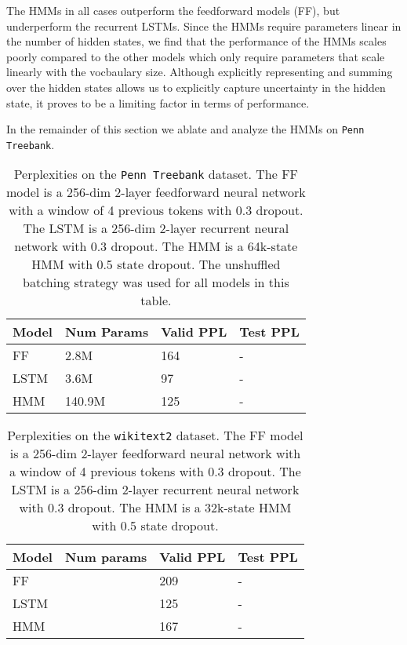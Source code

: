 \documentclass[11pt,a4paper]{article}
\begin{document}
The HMMs in all cases outperform the feedforward models (FF),
but underperform the recurrent LSTMs.
Since the HMMs require parameters linear in the number of hidden states,
we find that the performance of the HMMs scales poorly compared to the other models
which only require parameters that scale linearly with the vocbaulary size.
Although explicitly representing and summing over the hidden states
allows us to explicitly capture uncertainty in the hidden state,
it proves to be a limiting factor in terms of performance.

In the remainder of this section we ablate and analyze the HMMs on \texttt{Penn Treebank}.


\begin{table}[!t]
\centering
\caption{\label{tbl:ppl-ptb}
Perplexities on the \texttt{Penn Treebank} dataset.
The FF model is a 256-dim 2-layer feedforward neural network
with a window of 4 previous tokens with 0.3 dropout.
The LSTM is a 256-dim 2-layer recurrent neural network with 0.3 dropout.
The HMM is a 64k-state HMM with 0.5 state dropout.
The unshuffled batching strategy was used for all models in this table.
}
\begin{tabular}{llll}
\toprule
Model & Num Params & Valid PPL & Test PPL\\
\midrule
FF    & 2.8M       & 164         & -       \\
LSTM  & 3.6M       & 97          & -       \\
HMM   & 140.9M     & 125         & -       \\
\bottomrule
\end{tabular}
\end{table}

\begin{table}[!t]
\centering
\caption{\label{tbl:ppl-wikitext2}
Perplexities on the \texttt{wikitext2} dataset.
The FF model is a 256-dim 2-layer feedforward neural network
with a window of 4 previous tokens with 0.3 dropout.
The LSTM is a 256-dim 2-layer recurrent neural network with 0.3 dropout.
The HMM is a 32k-state HMM with 0.5 state dropout.
}
\begin{tabular}{llll}
\toprule
Model & Num params & Valid PPL & Test PPL\\
\midrule
FF    &            & 209       & -       \\
LSTM  &            & 125       & -       \\
HMM   &            & 167       & -       \\
\bottomrule
\end{tabular}
\end{table}
\end{document}
